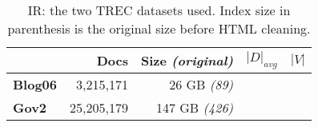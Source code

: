 \begin{table}
\centering
{\small
\begin{tabular}{|l|r|r|r|r|}
    \hline & \textbf{Docs} & \textbf{Size} \emph{(original)} & \textbf{$|D|_{avg}$} &
    \textbf{$|V|$} \\
    \hline
    \textbf{Blog06} & 3,215,171 & 26 GB \emph{(89)} & & \\
    \textbf{Gov2} & 25,205,179 & 147 GB \emph{(426)} & & \\
    \hline
\end{tabular}
\caption{IR: the two TREC datasets used. Index size in parenthesis is the
original size before HTML cleaning.}
}
\label{table:ir-datasets}
\end{table}
